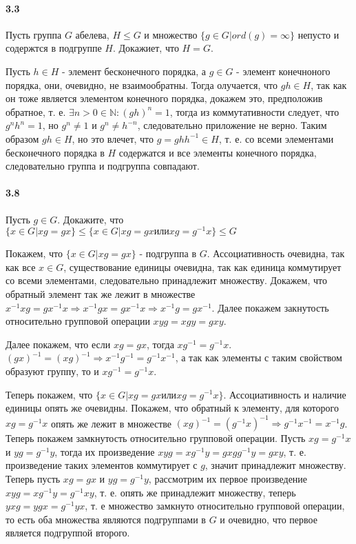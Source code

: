\documentclass[a4paper,12pt]{article}
\begin{document}
\paragraph{3.3} Пусть группа $G$ абелева, $H \le G$ и множество $\{g \in G | ord(g) = \infty\}$ непусто и содержтся в подгруппе $H$. Докажиет, что $H=G$.

\begin{Solution}
Пусть $h \in H$ - элемент бесконечного порядка, а $g \in G$ - элемент конечноного порядка, они, очевидно, не взаимообратны. Тогда олучается, что $gh \in H$, так как он тоже является элементом конечного порядка, докажем это, предположив обратное, т. е. $\exists n > 0 \in \mathbb{N} : (gh)^n = 1$, тогда из коммутативности следует, что $g^n h^n = 1$, но $g^n \not= 1$ и $g^n \not= h^{-n}$, следовательно приложение не верно. Таким образом $gh \in H$, но это влечет, что $ g = gh h^{-1} \in H$, т. е. со всеми элементами бесконечного порядка в $H$ содержатся и все элементы конечного порядка, следовательно группа и подгруппа совпадают.
\end{Solution}

\paragraph{3.8} Пусть $g \in G$. Докажите, что $\{x \in G | xg = gx\} \le \{x \in G | xg = gx \text{или} xg = g^{-1}x\} \le G$

\begin{Solution}
Покажем, что $\{x \in G | xg = gx\}$ - подгруппа в $G$. Ассоциативность очевидна, так как все $x \in G$, существование единицы очевидна, так как единица коммутирует со всеми элементами, следовательно принадлежит множеству. Докажем, что обратный элемент так же лежит в множестве $x^{-1}x g = g x^{-1}x \Rightarrow x^{-1} g x = g x^{-1} x \Rightarrow x^{-1} g = g x^{-1}$. Далее покажем закнутость относительно групповой операции $xyg = xgy = gxy$.

Далее покажем, что если $xg = gx$, тогда $xg^{-1} = g^{-1}x$. $(gx)^{-1} = (xg)^{-1} \Rightarrow x^{-1}g^{-1} = g^{-1}x^{-1}$, а так как элементы с таким свойством образуют группу, то и $x g^{-1} = g^{-1} x$.

Теперь покажем, что $\{x \in G | xg = gx \text{или} xg=g^{-1}x\}$. Ассоциативность и наличие единицы опять же очевидны. Покажем, что обратный к элементу, для которого $xg = g^{-1}x$ опять же лежит в множестве $(xg)^{-1} = (g^{-1}x)^{-1} \Rightarrow g^{-1}x^{-1} = x^{-1}g$. Теперь покажем замкнутость относительно групповой операции. Пусть $xg = g^{-1}x$ и $yg = g^{-1}y$, тогда их произведение $xyg = xg^{-1}y = gxgg^{-1}y = gxy$, т. е. произведение таких элементов коммутирует с $g$, значит принадлежит множеству. Теперь пусть $xg = gx$ и $yg = g^{-1}y$, рассмотрим их первое произведение $xyg = x g^{-1} y = g^{-1} xy$, т. е. опять же принадлежит множеству, теперь $yxg = ygx = g^{-1}yx$, т. е множество замкнуто относительно групповой операции, то есть оба множества являются подгруппами в $G$ и очевидно, что первое является подгруппой второго.
\end{Solution}
\end{document}
